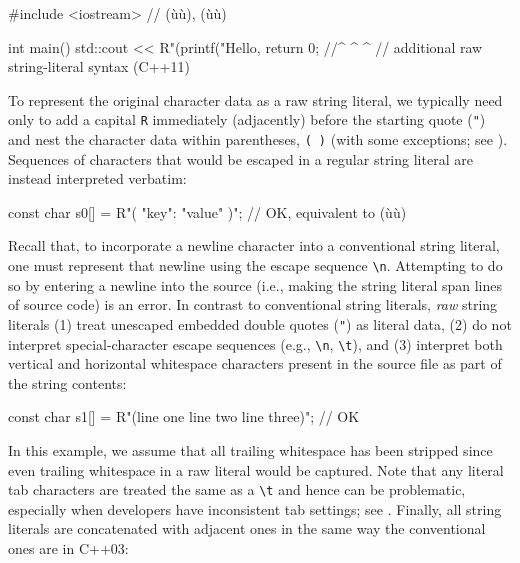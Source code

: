 \begin{emcppslisting}
#include <iostream>  // (ù{}ù), (ù{}ù)

int main()
{
    std::cout << R"(printf("Hello, %
    return 0;  //^ ^                                      ^
               //   additional raw string-literal syntax (C++11)
}
\end{emcppslisting}
    
\noindent To represent the original character
data as a raw string literal, we typically need only to add a capital \lstinline!R! immediately
(adjacently) before the starting quote (\lstinline!"!) and nest the
character data within parentheses, \lstinline!(!~\lstinline!)! (with some exceptions; see ).  
Sequences of
characters that would be escaped in a regular string literal are instead
interpreted verbatim:

\begin{emcppslisting}
const char s0[] = R"({ "key": "value" })";
    // OK, equivalent to (ù{}ù)
\end{emcppslisting}
    
\noindent Recall that, to incorporate a newline character into a conventional string literal, one must represent that newline using the escape sequence \lstinline!\n!.  Attempting to do so by entering a newline into the source (i.e., making the string literal span lines of source code) is an error. In contrast to conventional string literals, \emph{raw} string literals
(1) treat unescaped embedded double quotes (\lstinline!"!) as literal data,
(2) do not interpret special-character escape sequences (e.g.,
\lstinline!\n!, \lstinline!\t!), and (3) interpret both vertical and horizontal 
whitespace characters present in
the source file as part of the string contents:


\begin{emcppslisting}
const char s1[] = R"(line one
line two
    line three)";
    // OK
\end{emcppslisting}
    
\noindent In
this example, we assume that all trailing whitespace has been stripped
since even trailing whitespace in a raw literal would be captured. Note that any literal tab characters are treated the same as a
\lstinline!\t! and hence can be problematic, especially when
developers have inconsistent tab settings; see .  
Finally, all string literals are concatenated with
adjacent ones in the same way the conventional ones are in C++03:

